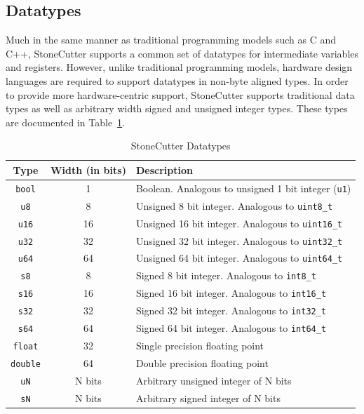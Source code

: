 \documentclass{article}
\begin{document}
\clearpage
\subsection{Datatypes}
\label{sec:Datatypes}

Much in the same manner as traditional programming models such as C and C++, StoneCutter 
supports a common set of datatypes for intermediate variables and registers.  However, unlike 
traditional programming models, hardware design languages are required to support datatypes 
in non-byte aligned types.  In order to provide more hardware-centric support, StoneCutter supports 
traditional data types as well as arbitrary width signed and unsigned integer types.  These types are 
documented in Table~\ref{tab:datatypes}. 

\begin{table}[h]
\begin{center}
\caption{StoneCutter Datatypes}
\vspace{0.125in}
\label{tab:datatypes}
\begin{tabular}{|c|c|l|}
\hline
\textbf{Type} & \textbf{Width (in bits)} & \textbf{Description}\\
\hline
\texttt{bool} & 1 & Boolean.  Analogous to unsigned 1 bit integer (\texttt{u1})\\
\hline
\texttt{u8} & 8 & Unsigned 8 bit integer. Analogous to \texttt{uint8\_t}\\
\hline
\texttt{u16} & 16 & Unsigned 16 bit integer. Analogous to \texttt{uint16\_t}\\
\hline
\texttt{u32} & 32 & Unsigned 32 bit integer. Analogous to \texttt{uint32\_t}\\
\hline
\texttt{u64} & 64 & Unsigned 64 bit integer. Analogous to \texttt{uint64\_t}\\
\hline
\texttt{s8} & 8 & Signed 8 bit integer. Analogous to \texttt{int8\_t}\\
\hline
\texttt{s16} & 16 & Signed 16 bit integer. Analogous to \texttt{int16\_t}\\
\hline
\texttt{s32} & 32 & Signed 32 bit integer. Analogous to \texttt{int32\_t}\\
\hline
\texttt{s64} & 64 & Signed 64 bit integer. Analogous to \texttt{int64\_t}\\
\hline
\texttt{float} & 32 & Single precision floating point\\
\hline
\texttt{double} & 64 & Double precision floating point\\
\hline
\texttt{uN} & N bits & Arbitrary unsigned integer of N bits\\
\hline
\texttt{sN} & N bits & Arbitrary signed integer of N bits\\
\hline
\end{tabular}
\end{center}
\end{table}
\end{document}
